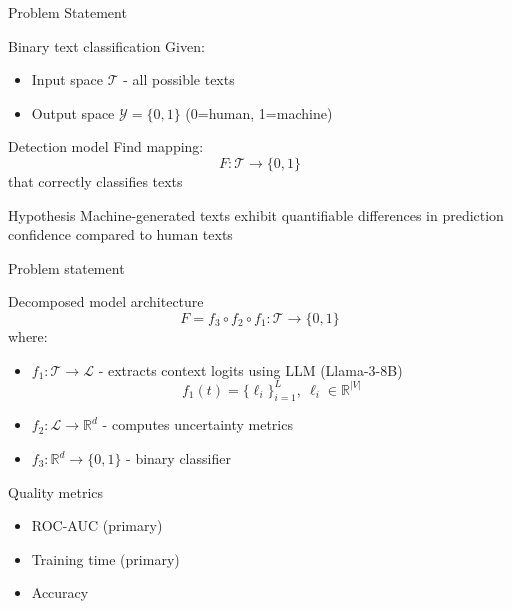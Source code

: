 \documentclass{beamer}
\begin{document}
\begin{frame}{Problem Statement}
\begin{block}{Binary text classification}
Given:
\begin{itemize}
    \item Input space $\mathcal{T}$ - all possible texts
    \item Output space $\mathcal{Y} = \{0,1\}$ (0=human, 1=machine)
\end{itemize}
\end{block}

\begin{block}{Detection model}
Find mapping:
\begin{equation*}
F: \mathcal{T} \rightarrow \{0,1\}
\end{equation*}
that correctly classifies texts
\end{block}

\begin{block}{Hypothesis}
Machine-generated texts exhibit quantifiable differences in prediction confidence compared to human texts
\end{block}
\end{frame}
\begin{frame}{Problem statement}

\begin{block}{Decomposed model architecture}
\begin{equation*}
F = f_3 \circ f_2 \circ f_1: \mathcal{T} \rightarrow \{0,1\}
\end{equation*}
where:
\begin{itemize}
    \item $f_1: \mathcal{T} \rightarrow \mathcal{L}$ - extracts context logits using LLM (Llama-3-8B)
    \begin{equation*}
    f_1(t) = \{\ell_i\}_{i=1}^L,\ \ell_i \in \mathbb{R}^{|V|}
    \end{equation*}
    
    \item $f_2: \mathcal{L} \rightarrow \mathbb{R}^d$ - computes uncertainty metrics
    
    \item $f_3: \mathbb{R}^d \rightarrow \{0,1\}$ - binary classifier
\end{itemize}
\end{block}

\begin{block}{Quality metrics}
\begin{itemize}
    \item ROC-AUC (primary)
    \item Training time (primary)
    \item Accuracy
\end{itemize}
\end{block}
\end{frame}
\end{document}
